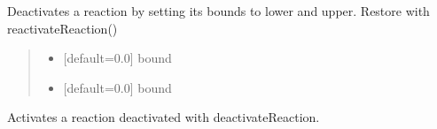 \documentclass[letterpaper,12pt,english]{sphinxmanual}
\begin{document}
\begin{fulllineitems}
\begin{fulllineitems}
\begin{quote}
\begin{description}
\end{description}\end{quote}

\end{fulllineitems}


\begin{fulllineitems}
\label{\detokenize{api/core:cbmpy.CBModel.Reaction.deactivateReaction}}
\pysigstartsignatures
\pysiglinewithargsret
{}
{\sphinxparamcomma {}\sphinxparamcomma {}}
{}
\pysigstopsignatures
\sphinxAtStartPar
Deactivates a reaction by setting its bounds to lower and upper. Restore with reactivateReaction()
\begin{quote}\begin{description}
\begin{itemize}
\item {} 
\sphinxAtStartPar
{} \textendash{} {[}default=0.0{]} bound

\item {} 
\sphinxAtStartPar
{} \textendash{} {[}default=0.0{]} bound

\end{itemize}

\end{description}\end{quote}

\end{fulllineitems}


\begin{fulllineitems}
\label{\detokenize{api/core:cbmpy.CBModel.Reaction.reactivateReaction}}
\pysigstartsignatures
\pysiglinewithargsret
{}
{}
{}
\pysigstopsignatures
\sphinxAtStartPar
Activates a reaction deactivated with deactivateReaction.


\end{fulllineitems}
\end{fulllineitems}
\end{document}
